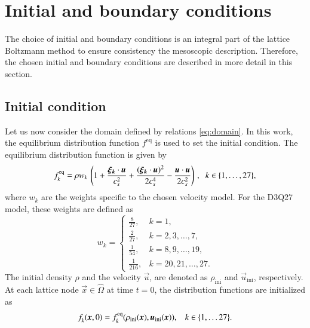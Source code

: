 \section{Initial and boundary conditions}\label{pocatecni a okrajove podminky}

The choice of initial and boundary conditions is an integral part of the lattice Boltzmann method to ensure consistency the mesoscopic description. Therefore, the chosen initial and boundary conditions are described in more detail in this section.

\subsection{Initial condition}\label{pocatecni podminka}
Let us now consider the domain defined by relations \eqref{eq:domain}. In this work, the equilibrium distribution function \( f^{\mathrm{eq}} \) is used to set the initial condition. The equilibrium distribution function is given by
\begin{equation}\label{eq:feq}
	f^{\mathrm{eq}}_{k} = \rho w_{k} \, \left(1 + \frac{\vec{\xi_{k}} \cdot \vec{u}}{c^{2}_{s}} + \frac{(\vec{\xi_{k}} \cdot \vec{u})^2}{2c^{4}_{s}} - \frac{\vec{u} \cdot \vec{u}}{2c^{2}_{s}} \right)\, , \hspace{2mm} k \in \{1,\dots,27\},
\end{equation}
where \( w_{k} \) are the weights specific to the chosen velocity model. For the D3Q27 model, these weights are defined as \cite{Kruger}
\begin{equation}
	w_k= \begin{cases}\frac{8}{27}, & k=1, \\ \frac{2}{27}, & k = 2,3, \ldots, 7, \\ \frac{1}{54}, & k = 8,9, \ldots, 19, \\ \frac{1}{216}, & k = 20,21, \ldots, 27.\end{cases}
\end{equation}
The initial density \( \rho \) and the velocity \( \vec{u} \), are denoted as \( \rho _{\mathrm{ini}} \) and \( \vec{u} _{\mathrm{ini}} \), respectively. At each lattice node \( \vec{x} \in \hat{\Omega} \) at time \( t=0 \), the distribution functions are initialized as
\begin{equation}\label{eq:initial condition}
	f^{}_{k} (\vec{x}, 0) = f^{\mathrm{eq}}_{k} (\rho _{\mathrm{ini}} (\vec{x}), \vec{u} _{\mathrm{ini}} (\vec{x})), \hspace{3mm} k \in \{1, \dots 27\}.
\end{equation}

